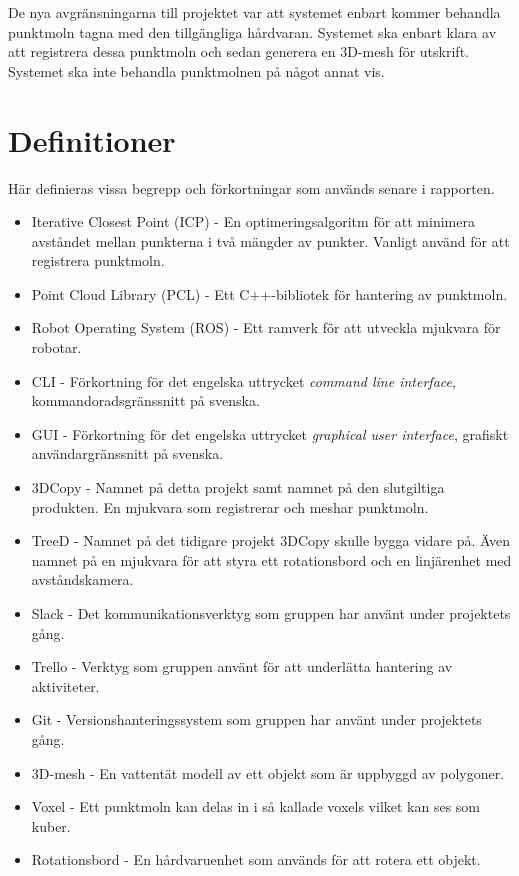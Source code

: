 De nya avgränsningarna till projektet var att systemet enbart kommer behandla punktmoln tagna med den tillgängliga hårdvaran. Systemet ska enbart klara av att registrera dessa punktmoln och sedan generera en 3D-mesh för utskrift. Systemet ska inte behandla punktmolnen på något annat vis.

\section{Definitioner}
\label{sec:definitions}
Här definieras vissa begrepp och förkortningar som används senare i rapporten.

\begin{itemize}
	\item Iterative Closest Point (ICP) - En optimeringsalgoritm för att minimera avståndet mellan punkterna i två mängder av punkter. Vanligt använd för att registrera punktmoln.
	\item Point Cloud Library (PCL) - Ett C++-bibliotek för hantering av punktmoln.
	\item Robot Operating System (ROS) - Ett ramverk för att utveckla mjukvara för robotar.
	\item CLI - Förkortning för det engelska uttrycket \textit{command line interface}, kommandoradsgränssnitt på svenska.
	\item GUI - Förkortning för det engelska uttrycket \textit{graphical user interface}, grafiskt användargränssnitt på svenska.
	\item 3DCopy - Namnet på detta projekt samt namnet på den slutgiltiga produkten. En mjukvara som registrerar och meshar punktmoln.
	\item TreeD - Namnet på det tidigare projekt 3DCopy skulle bygga vidare på. Även namnet på en mjukvara för att styra ett rotationsbord och en linjärenhet med avståndskamera.
	\item Slack - Det kommunikationsverktyg som gruppen har använt under projektets gång.
	\item Trello - Verktyg som gruppen använt för att underlätta hantering av aktiviteter.
	\item Git - Versionshanteringssystem som gruppen har använt under projektets gång.
	\item 3D-mesh - En vattentät modell av ett objekt som är uppbyggd av polygoner.
	\item Voxel - Ett punktmoln kan delas in i så kallade voxels vilket kan ses som kuber.
	\item Rotationsbord - En hårdvaruenhet som används för att rotera ett objekt.

\end{itemize}
